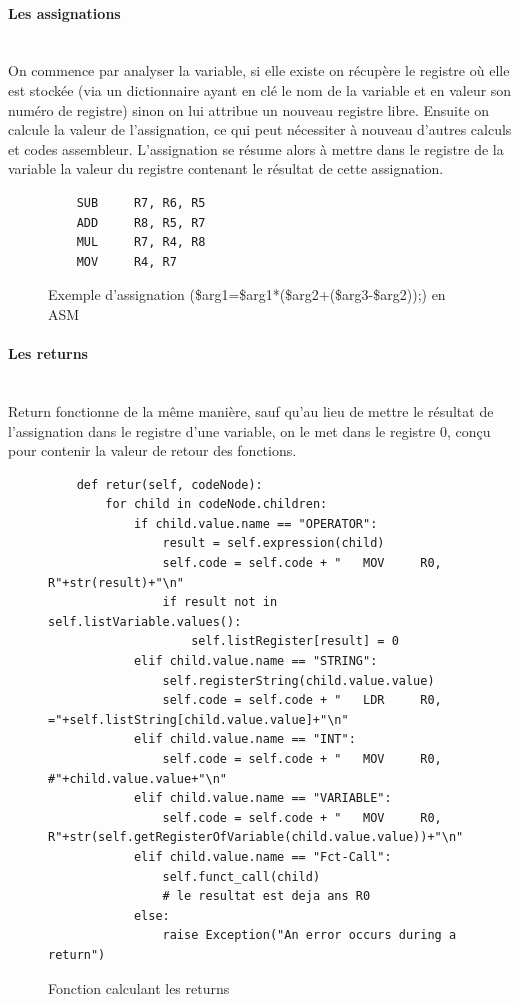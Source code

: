 \documentclass[a4paper,10pt]{article}
\begin{document}
		\paragraph{Les assignations}~\\
			On commence par analyser la variable, si elle existe on récupère le registre où elle est stockée (via un dictionnaire ayant en clé le nom de la variable et en valeur son numéro de registre) sinon on lui attribue un nouveau registre libre. Ensuite on calcule la valeur de l'assignation, ce qui peut nécessiter à nouveau d'autres calculs et codes assembleur. L'assignation se résume alors à mettre dans le registre de la variable la valeur du registre contenant le résultat de cette assignation.
				\begin{figure}[H]
\begin{lstlisting}
	SUB		R7, R6, R5
	ADD		R8, R5, R7
	MUL		R7, R4, R8
	MOV 	R4, R7
\end{lstlisting}
\fontfamily{}
\caption{Exemple d'assignation (\$arg1=\$arg1*(\$arg2+(\$arg3-\$arg2));) en ASM}
\label{lst:ExAssignation}
\end{figure}		
		
		\paragraph{Les returns}~\\
			Return fonctionne de la même manière, sauf qu'au lieu de mettre le résultat de l'assignation dans le registre d'une variable, on le met dans le registre 0, conçu pour contenir la valeur de retour des fonctions.
				\begin{figure}[H]
\begin{lstlisting}
	def retur(self, codeNode):
		for child in codeNode.children:
			if child.value.name == "OPERATOR": 
				result = self.expression(child)
				self.code = self.code + "	MOV 	R0, R"+str(result)+"\n"
				if result not in self.listVariable.values():
					self.listRegister[result] = 0					
			elif child.value.name == "STRING": 
				self.registerString(child.value.value)
				self.code = self.code + "	LDR 	R0, ="+self.listString[child.value.value]+"\n"
			elif child.value.name == "INT": 
				self.code = self.code + "	MOV 	R0, #"+child.value.value+"\n"				
			elif child.value.name == "VARIABLE": 
				self.code = self.code + "	MOV 	R0, R"+str(self.getRegisterOfVariable(child.value.value))+"\n"				
			elif child.value.name == "Fct-Call": 
				self.funct_call(child)
				# le resultat est deja ans R0		
			else:
				raise Exception("An error occurs during a return")
\end{lstlisting}
\fontfamily{}
\caption{Fonction calculant les returns}
\label{lst:ExReturn}
\end{figure}
\end{document}
